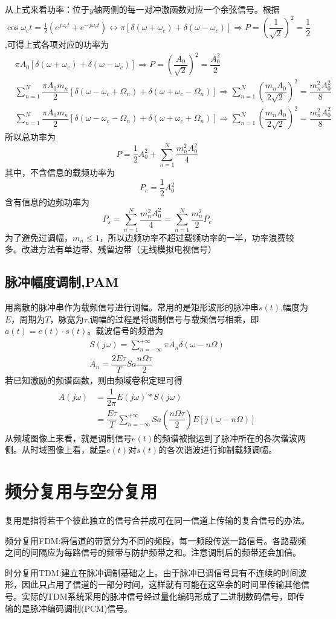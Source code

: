 从上式来看功率：位于$y$轴两侧的每一对冲激函数对应一个余弦信号。根据$\cos \omega_c t = \frac{1}{2}(e^{j\omega_c t}+e^{-j\omega_c t}) \leftrightarrow \pi [\delta(\omega+\omega_c)+\delta(\omega-\omega_c)] \Rightarrow P=(\dfrac{1}{\sqrt{2}})^2=\dfrac{1}{2}$,可得上式各项对应的功率为
\begin{align}
    &\pi A_0[\delta(\omega+\omega_c)+\delta(\omega-\omega_c)] \Rightarrow P=(\dfrac{A_0}{\sqrt{2}})^2=\dfrac{A_0^2}{2}\\
    &\sum_{n=1}^{N}\dfrac{\pi A_0 m_n}{2}[\delta(\omega-\omega_c+\Omega_n)+\delta(\omega+\omega_c-\Omega_n)]\Rightarrow \sum_{n=1}^{N} (\dfrac{m_n A_0}{2 \sqrt{2}})^2=\dfrac{m_n^2 A_0^2}{8}\\
    &\sum_{n=1}^{N}\dfrac{\pi A_0 m_n}{2}[\delta(\omega-\omega_c-\Omega_n)+\delta(\omega+\omega_c+\Omega_n)]\Rightarrow \sum_{n=1}^{N} (\dfrac{m_n A_0}{2 \sqrt{2}})^2=\dfrac{m_n^2 A_0^2}{8}
\end{align}
所以总功率为
\begin{equation}
    P=\dfrac{1}{2}A_0^2+\sum_{n=1}^{N} \dfrac{m_n^2 A_0^2}{4}
\end{equation}
其中，不含信息的载频功率为
\begin{equation}
    P_c=\dfrac{1}{2}A_0^2
\end{equation}
含有信息的边频功率为
\begin{equation}
    P_s=\sum_{n=1}^{N} \dfrac{m_n^2 A_0^2}{4}=\sum_{n=1}^{N} \dfrac{m_n^2}{2}P_c
\end{equation}
为了避免过调幅，$m_n\leq 1$，所以边频功率不超过载频功率的一半，功率浪费较多。改进方法有单边带、残留边带（无线模拟电视信号）
\subsection{脉冲幅度调制,PAM}
用离散的脉冲串作为载频信号进行调幅。常用的是矩形波形的脉冲串$s(t)$,幅度为$E$，周期为$T$，脉宽为$\tau$,调幅的过程是将调制信号与载频信号相乘，即$a(t)=e(t)\cdot s(t)$。载波信号的频谱为
\begin{align}
    S(j\omega)=\sum_{n=-\infty}^{+\infty}\pi \dot{A}_n \delta (\omega - n \Omega)\\
    \dot{A}_n=\dfrac{2E\tau}{T}Sa \dfrac{n \Omega \tau}{2}
\end{align}
若已知激励的频谱函数，则由频域卷积定理可得
\begin{align}
    A(j\omega)&=\dfrac{1}{2\pi}E(j\omega)*S(j\omega)\\
    &=\dfrac{E\tau}{T}\sum_{n=-\infty}^{+\infty} Sa(\dfrac{n\Omega\tau}{2})E[j(\omega-n\Omega)]
\end{align}
从频域图像上来看，就是调制信号$e(t)$的频谱被搬运到了脉冲所在的各次谐波两侧。从时域图像上看，就是$e(t)$对$s(t)$的各次谐波进行抑制载频调幅。
\section{频分复用与空分复用}
复用是指将若干个彼此独立的信号合并成可在同一信道上传输的复合信号的办法。

频分复用FDM:将信道的带宽分为不同的频段，每一频段传送一路信号。各路载频之间的间隔应为每路信号的频带与防护频带之和。注意调制后的频带还会加倍。

时分复用TDM:建立在脉冲调制基础之上。由于脉冲已调信号具有不连续的时间波形，因此只占用了信道的一部分时间，这样就有可能在这空余的时间里传输其他信号。实际的TDM系统采用的脉冲信号经过量化编码形成了二进制数码信号，即传输的是脉冲编码调制(PCM)信号。


